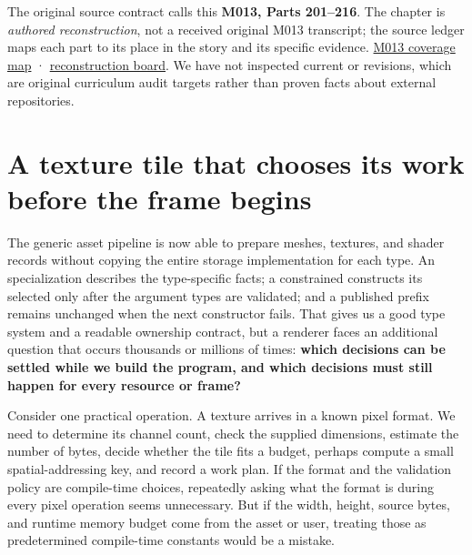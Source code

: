 The original source contract calls this \textbf{M013, Parts 201--216}. The chapter is \emph{authored reconstruction}, not a received original M013 transcript; the source ledger maps each part to its place in the story and its specific evidence. \hyperref[appendix-fd090d982a15-m013-parts-201216-generic-asset-preparation-with-constrained-apis]{M013 coverage map} · \hyperref[appendix-960160274237-one-asset-pipeline-many-types-m013-retrieval]{reconstruction board}. We have not inspected current  or  revisions, which are original curriculum audit targets rather than proven facts about external repositories.

\section{A texture tile that chooses its work before the frame begins}\label{05-engine-i-ch005-a-texture-tile-that-chooses-its-work-before-the-frame-begins}

\hypertarget{05-engine-i-ch005-a-texture-tile-that-chooses-its-work-before-the-frame-begins}{}

The generic asset pipeline is now able to prepare meshes, textures, and shader records without copying the entire storage implementation for each type. An  specialization describes the type-specific facts; a constrained  constructs its selected  only after the argument types are validated; and a published prefix remains unchanged when the next constructor fails. That gives us a good type system and a readable ownership contract, but a renderer faces an additional question that occurs thousands or millions of times: \textbf{which decisions can be settled while we build the program, and which decisions must still happen for every resource or frame?}

Consider one practical operation. A texture arrives in a known pixel format. We need to determine its channel count, check the supplied dimensions, estimate the number of bytes, decide whether the tile fits a budget, perhaps compute a small spatial-addressing key, and record a work plan. If the format and the validation policy are compile-time choices, repeatedly asking what the format is during every pixel operation seems unnecessary. But if the width, height, source bytes, and runtime memory budget come from the asset or user, treating those as predetermined compile-time constants would be a mistake.

